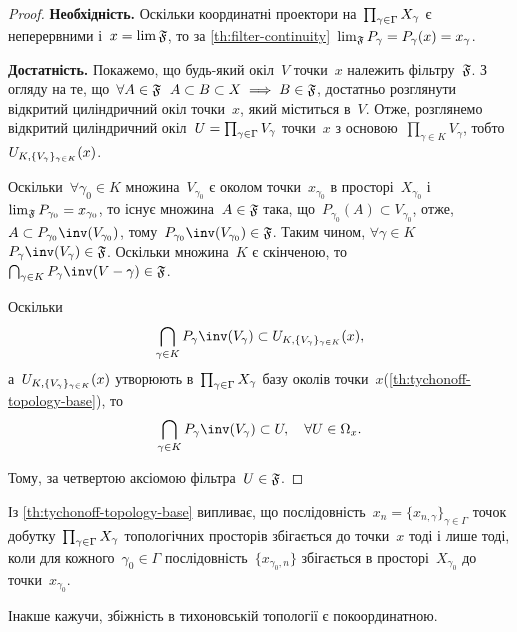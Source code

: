 \begin{proof}
    \textbf{Необхідність.} Оскільки координатні проектори на~$\prod_{\gamma\in\Gamma}{X}_\gamma$ є неперервними і~$x = \lim \frak F$, то за \cref{th:filter-continuity}~$\lim_{\frak F} P_\gamma = P_\gamma(x) = x_\gamma$.

    \textbf{Достатність.} Покажемо, що будь-який окіл~$V$ точки~$x$ належить фільтру~$\frak F$. З огляду на те, що~$\forall A \in \frak F$~$A \subset B \subset X \implies B \in \frak F$, достатньо розглянути відкритий циліндричний окіл точки~$x$, який міститься в~$V$. Отже, розглянемо відкритий циліндричний окіл~$U = \prod_{\gamma\in\Gamma}{V}_\gamma$ точки~$x$ з основою~$\prod_{\gamma \in K} V_\gamma$, тобто~$U_{K,\{V_\gamma\}_{\gamma\in K}}(x)$.
    
    Оскільки~$\forall \gamma_0 \in K$ множина~$V_{\gamma_0}$ є околом точки~$x_{\gamma_0}$ в просторі~$X_{\gamma_0}$ і~$\lim_{\frak F} P_{\gamma_0} = x_{\gamma_0}$, то існує множина~$A \in \frak F$ така, що~$P_{\gamma_0}(A) \subset V_{\gamma_0}$, отже, $A \subset P_{\gamma_0}\inv(V_{\gamma_0})$, тому~$P_{\gamma_0}\inv(V_{\gamma_0}) \in \frak F$. Таким чином, $\forall \gamma \in K$~$P_\gamma\inv(V_\gamma) \in \frak F$. Оскільки множина~$K$ є скінченою, то~$\bigcap_{\gamma \in K} P_\gamma\inv(V-\gamma) \in \frak F$.
    
    Оскільки
    \begin{equation*}
        \bigcap_{\gamma \in K} P_\gamma\inv(V_\gamma) \subset \CartesianNeighbourhood{x},
    \end{equation*}
    а~$U_{K,\{V_\gamma\}_{\gamma\in K}}(x)$ утворюють в~$\prod_{\gamma\in\Gamma}{X}_\gamma$ базу околів точки~$x$(\cref{th:tychonoff-topology-base}), то
    \begin{equation*}
        \bigcap_{\gamma \in K} P_\gamma\inv(V_\gamma) \subset U, \quad \forall U \in \Omega_x.
    \end{equation*}

    Тому, за четвертою аксіомою фільтра~$U \in \frak F$.
\end{proof}

\begin{remark}
    Із \cref{th:tychonoff-topology-base} випливає, що послідовність~$x_n = \{x_{n,\gamma}\}_{\gamma \in \Gamma}$ точок добутку~$\prod_{\gamma\in\Gamma}{X}_\gamma$ топологічних просторів збігається до точки~$x$ тоді і лише тоді, коли для кожного~$\gamma_0 \in \Gamma$ послідовність~$\{x_{\gamma_0, n}\}$ збігається в просторі~$X_{\gamma_0}$ до точки~$x_{\gamma_0}$. 
    
    Інакше кажучи, збіжність в тихоновській топології є покоординатною.
\end{remark}

